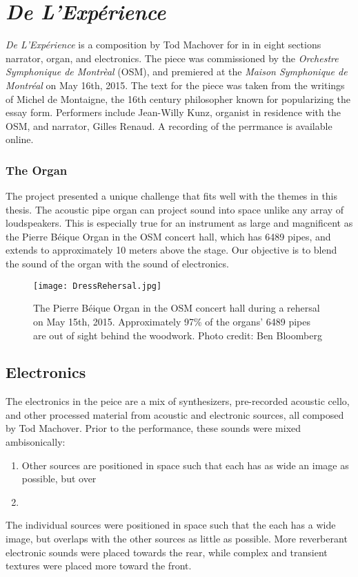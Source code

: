 \clearpage
\chapter{\textit{De L'Exp\'{e}rience}}
\label{ch:experience}

\textit{De L'Exp\'{e}rience} is a composition by Tod Machover for in
in eight sections 
narrator, organ, and electronics. The piece was commissioned by the
\textit{Orchestre Symphonique de Montr\`{e}al} (OSM), and premiered at
the \textit{Maison Symphonique de Montr\'{e}al} on May 16th, 2015. The
text for the piece was taken from the writings of Michel de Montaigne,
the 16th century philosopher known for popularizing the essay form.
Performers include Jean-Willy Kunz, organist in residence with the
OSM, and narrator, Gilles Renaud. A recording of the perrmance is
available
online.


\subsection{The Organ}
\label{sec:organ}
The project presented a unique challenge that fits well with the
themes in this thesis. The acoustic pipe organ can project sound into
space unlike any array of loudspeakers. This is especially true for an
instrument as large and magnificent as the Pierre B\'{e}ique Organ in
the OSM concert hall, which has 6489 pipes, and extends to
approximately 10 meters above the stage. Our objective is to blend
the sound of the organ with the sound of electronics. 

\begin{figure*}[]
  \texttt{[image: DressRehersal.jpg]}
  \caption{The Pierre B\'{e}ique Organ in the OSM concert hall during
    a rehersal on May 15th, 2015. Approximately 97\% of the organs'
    6489 pipes are out of sight behind the woodwork. Photo credit: Ben
    Bloomberg}
  \label{fig:le-corbusier-sketch}
\end{figure*}


\section{Electronics}
\label{sec:electronics}
The electronics in the peice are a mix of synthesizers, pre-recorded
acoustic cello, and other processed material from acoustic and
electronic sources, all composed by Tod Machover. Prior to the
performance, these sounds were mixed ambisonically:
\begin{enumerate}
\item Other sources are positioned in space such that each has as wide
  an image as possible, but over 
\item {}
\end{enumerate}The individual
sources were positioned in space such that the each has a wide image,
but overlaps with the other sources as little as possible. More
reverberant electronic sounds were placed towards the rear, while
complex and transient textures were placed more toward the front. 

